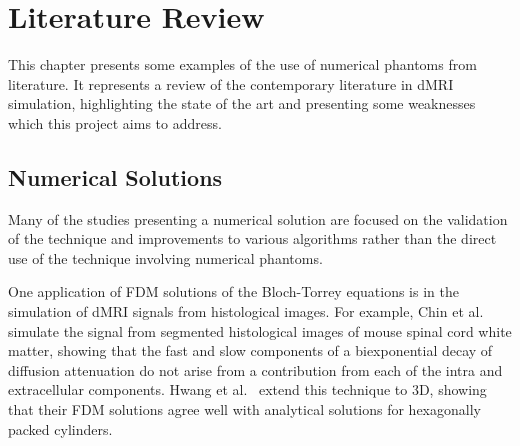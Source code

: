 \chapter{Literature Review}
\label{sec:literature_review}

\chaptertoc{}

\begin{chapterabstract}
  This chapter presents some examples of the use of numerical phantoms from literature.
  It represents a review of the contemporary literature in \ac{dMRI} simulation, highlighting the state of the art and presenting some weaknesses which this project aims to address. 
\end{chapterabstract}




 

\section{Numerical Solutions}
\label{sec:app_numerical_solutions}
Many of the studies presenting a numerical solution are focused on the validation of the technique and improvements to various algorithms rather than the direct use of the technique involving numerical phantoms.

One application of \ac{FDM} solutions of the Bloch-Torrey equations is in the simulation of \ac{dMRI} signals from histological images.
For example, Chin et al.\ \cite{Chin2002} simulate the signal from segmented histological images of mouse spinal cord white matter, showing that the fast and slow components of a biexponential decay of diffusion attenuation do not arise from a contribution from each of the intra and extracellular components.
Hwang et al.\ \cite{Hwang2003} extend this technique to 3D, showing that their \ac{FDM} solutions agree well with analytical solutions for hexagonally packed cylinders. 

